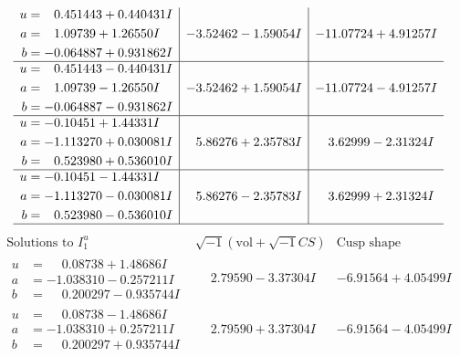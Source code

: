\documentclass[1p]{elsarticle_modified}
\theoremstyle{definition}
\newcommand{\I}{\sqrt{-1}}
\begin{document}
$$\begin{array}{c|c|c}
\begin{aligned}
u &= \phantom{-}0.451443 + 0.440431 I \\
a &= \phantom{-}1.09739 + 1.26550 I \\
b &= -0.064887 + 0.931862 I\end{aligned}
 & -3.52462 - 1.59054 I & -11.07724 + 4.91257 I \\ \hline\begin{aligned}
u &= \phantom{-}0.451443 - 0.440431 I \\
a &= \phantom{-}1.09739 - 1.26550 I \\
b &= -0.064887 - 0.931862 I\end{aligned}
 & -3.52462 + 1.59054 I & -11.07724 - 4.91257 I \\ \hline\begin{aligned}
u &= -0.10451 + 1.44331 I \\
a &= -1.113270 + 0.030081 I \\
b &= \phantom{-}0.523980 + 0.536010 I\end{aligned}
 & \phantom{-}5.86276 + 2.35783 I & \phantom{-}3.62999 - 2.31324 I \\ \hline\begin{aligned}
u &= -0.10451 - 1.44331 I \\
a &= -1.113270 - 0.030081 I \\
b &= \phantom{-}0.523980 - 0.536010 I\end{aligned}
 & \phantom{-}5.86276 - 2.35783 I & \phantom{-}3.62999 + 2.31324 I\\
 \hline 
 \end{array}$$\newpage$$\begin{array}{c|c|c}  
\text{Solutions to }I^u_{1}& \I (\text{vol} + \sqrt{-1}CS) & \text{Cusp shape}\\
 \hline 
\begin{aligned}
u &= \phantom{-}0.08738 + 1.48686 I \\
a &= -1.038310 - 0.257211 I \\
b &= \phantom{-}0.200297 - 0.935744 I\end{aligned}
 & \phantom{-}2.79590 - 3.37304 I & -6.91564 + 4.05499 I \\ \hline\begin{aligned}
u &= \phantom{-}0.08738 - 1.48686 I \\
a &= -1.038310 + 0.257211 I \\
b &= \phantom{-}0.200297 + 0.935744 I\end{aligned}
 & \phantom{-}2.79590 + 3.37304 I & -6.91564 - 4.05499 I \\ \hline\begin{aligned}

\end{aligned}
\end{array}$$
\end{document}
